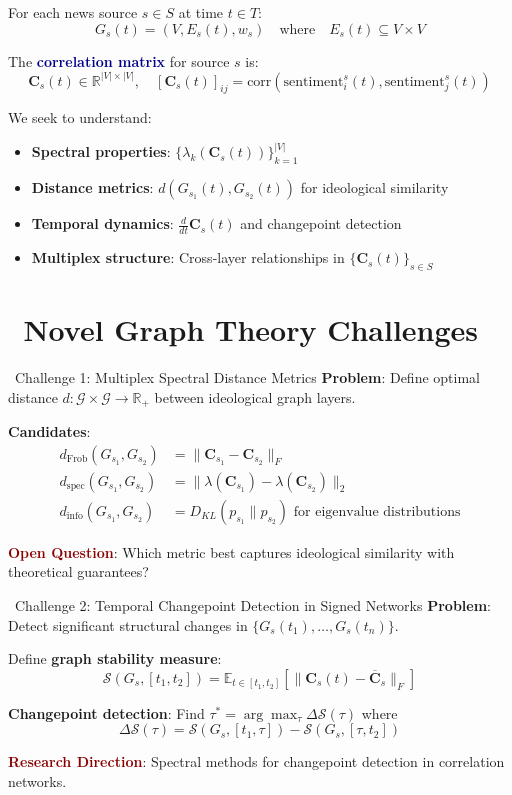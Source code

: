 \documentclass[11pt]{article}
\newcommand{\highlight}[1]{\textcolor{darkblue}{\textbf{#1}}}
\newcommand{\warning}[1]{\textcolor{darkred}{\textbf{#1}}}
\begin{document}
For each news source $s \in S$ at time $t \in T$:
$$G_s(t) = (V, E_s(t), w_s) \quad \text{where} \quad E_s(t) \subseteq V \times V$$

The \highlight{correlation matrix} for source $s$ is:
$$\mathbf{C}_s(t) \in \mathbb{R}^{|V| \times |V|}, \quad [\mathbf{C}_s(t)]_{ij} = \text{corr}(\text{sentiment}_i^s(t), \text{sentiment}_j^s(t))$$

We seek to understand:
\begin{itemize}[leftmargin=2em]
    \item[\faArrowRight] \textbf{Spectral properties}: $\{\lambda_k(\mathbf{C}_s(t))\}_{k=1}^{|V|}$
    \item[\faArrowRight] \textbf{Distance metrics}: $d(G_{s_1}(t), G_{s_2}(t))$ for ideological similarity
    \item[\faArrowRight] \textbf{Temporal dynamics}: $\frac{d}{dt}\mathbf{C}_s(t)$ and changepoint detection
    \item[\faArrowRight] \textbf{Multiplex structure}: Cross-layer relationships in $\{\mathbf{C}_s(t)\}_{s \in S}$
\end{itemize}

\section{\faLightbulb \, Novel Graph Theory Challenges}

\begin{challengebox}{\faPuzzlePiece \, Challenge 1: Multiplex Spectral Distance Metrics}
\textbf{Problem}: Define optimal distance $d: \mathcal{G} \times \mathcal{G} \to \mathbb{R}_+$ between ideological graph layers.

\textbf{Candidates}:
\begin{align}
d_{\text{Frob}}(G_{s_1}, G_{s_2}) &= \|\mathbf{C}_{s_1} - \mathbf{C}_{s_2}\|_F \\
d_{\text{spec}}(G_{s_1}, G_{s_2}) &= \|\lambda(\mathbf{C}_{s_1}) - \lambda(\mathbf{C}_{s_2})\|_2 \\
d_{\text{info}}(G_{s_1}, G_{s_2}) &= D_{KL}(p_{s_1} \| p_{s_2}) \text{ for eigenvalue distributions}
\end{align}

\warning{Open Question}: Which metric best captures ideological similarity with theoretical guarantees?
\end{challengebox}

\begin{challengebox}{\faClockO \, Challenge 2: Temporal Changepoint Detection in Signed Networks}
\textbf{Problem}: Detect significant structural changes in $\{G_s(t_1), \ldots, G_s(t_n)\}$.

Define \textbf{graph stability measure}:
$$\mathcal{S}(G_s, [t_1, t_2]) = \mathbb{E}_{t \in [t_1, t_2]} \left[ \|\mathbf{C}_s(t) - \overline{\mathbf{C}}_s\|_F \right]$$

\textbf{Changepoint detection}: Find $\tau^* = \arg\max_\tau \Delta\mathcal{S}(\tau)$ where
$$\Delta\mathcal{S}(\tau) = \mathcal{S}(G_s, [t_1, \tau]) - \mathcal{S}(G_s, [\tau, t_2])$$

\warning{Research Direction}: Spectral methods for changepoint detection in correlation networks.
\end{challengebox}
\end{document}

